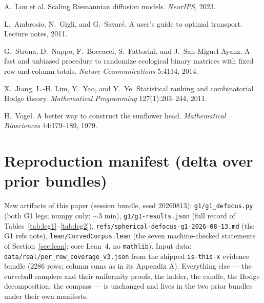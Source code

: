\documentclass[11pt,a4paper]{article}
\theoremstyle{plain}
\theoremstyle{remark}
\begin{document}
\medskip\noindent A.~Lou et al. Scaling Riemannian diffusion models. \emph{NeurIPS}, 2023.

\medskip\noindent L.~Ambrosio, N.~Gigli, and G.~Savar\'e. A user's guide to optimal transport. Lecture notes, 2011.

\medskip\noindent G.~Strona, D.~Nappo, F.~Boccacci, S.~Fattorini, and J.~San-Miguel-Ayanz. A fast and unbiased procedure to randomize ecological binary matrices with fixed row and column totals. \emph{Nature Communications} 5:4114, 2014.

\medskip\noindent X.~Jiang, L.-H. Lim, Y.~Yao, and Y.~Ye. Statistical ranking and combinatorial Hodge theory. \emph{Mathematical Programming} 127(1):203--244, 2011.

\medskip\noindent H.~Vogel. A better way to construct the sunflower head. \emph{Mathematical Biosciences} 44:179--189, 1979.

\appendix

\section{Reproduction manifest (delta over prior bundles)}
\label{app:manifest}

New artifacts of this paper (session bundle, seed $20260813$): \texttt{g1/g1\_defocus.py} (both G1 legs; numpy only; ${\sim}3$ min), \texttt{g1/g1-results.json} (full record of Tables~\ref{tab:leg1}--\ref{tab:leg2}), \texttt{refs/spherical-defocus-g1-2026-08-13.md} (the G1 refs note), \texttt{lean/CurvedCorpus.lean} (the seven machine-checked statements of Section~\ref{sec:lean}; core Lean~4, no \texttt{mathlib}). Input data: \texttt{data/real/per\_row\_coverage\_v3.json} from the shipped \texttt{is-this-x} evidence bundle (2286 rows; column sums as in its Appendix A). Everything else --- the curveball samplers and their uniformity proofs, the ladder, the candle, the Hodge decomposition, the compass --- is unchanged and lives in the two prior bundles under their own manifests.
\end{document}
